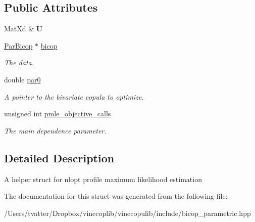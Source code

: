 \subsection*{Public Attributes}
\begin{DoxyCompactItemize}
\item 
\mbox{\label{struct_par_bicop_p_m_l_e_data_a1e3c086936bd76d56011ba2421e5bcd0}} 
Mat\+Xd \& {\bfseries U}
\item 
\mbox{\label{struct_par_bicop_p_m_l_e_data_a45c8c88af2c9c945952e8a7f904b0a0a}} 
\hyperlink{class_par_bicop}{Par\+Bicop} $\ast$ \hyperlink{struct_par_bicop_p_m_l_e_data_a45c8c88af2c9c945952e8a7f904b0a0a}{bicop}
\begin{DoxyCompactList}\small\item\em The data. \end{DoxyCompactList}\item 
\mbox{\label{struct_par_bicop_p_m_l_e_data_a21666a007414731f6c32d38814d02cf8}} 
double \hyperlink{struct_par_bicop_p_m_l_e_data_a21666a007414731f6c32d38814d02cf8}{par0}
\begin{DoxyCompactList}\small\item\em A pointer to the bivariate copula to optimize. \end{DoxyCompactList}\item 
\mbox{\label{struct_par_bicop_p_m_l_e_data_a90a2ef2424507c462f8f74a3e5305704}} 
unsigned int \hyperlink{struct_par_bicop_p_m_l_e_data_a90a2ef2424507c462f8f74a3e5305704}{pmle\+\_\+objective\+\_\+calls}
\begin{DoxyCompactList}\small\item\em The main dependence parameter. \end{DoxyCompactList}\end{DoxyCompactItemize}


\subsection{Detailed Description}
A helper struct for nlopt profile maximum likelihood estimation 

The documentation for this struct was generated from the following file\+:\begin{DoxyCompactItemize}
\item 
/\+Users/tvatter/\+Dropbox/vinecoplib/vinecopulib/include/bicop\+\_\+parametric.\+hpp\end{DoxyCompactItemize}
